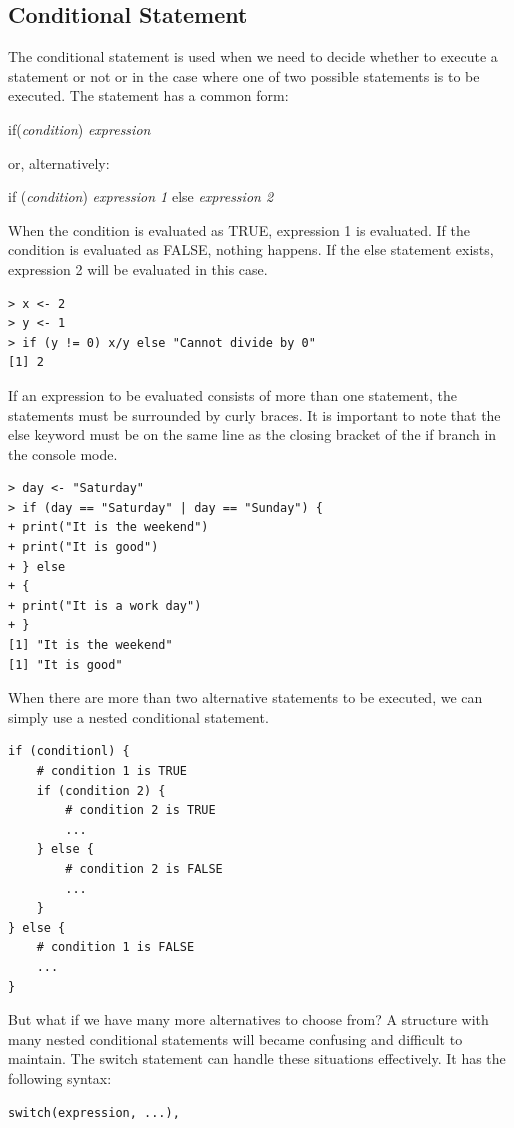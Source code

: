 \documentclass[11pt,openany,executivepaper]{book}
\begin{document}
\subsection{Conditional Statement}
The conditional statement is used when we need to decide whether to execute a statement or not or in the case where one of two possible statements is to be executed. The statement has a common form:

\begin{center}
if(\textit{condition}) \textit{expression}
\end{center}

or, alternatively:
\begin{center}
if (\textit{condition}) \textit{expression 1} else \textit{expression 2}
\end{center}

When the condition is evaluated as TRUE, expression 1 is evaluated. If the condition is evaluated as FALSE, nothing happens. If the else statement exists, expression 2 will be evaluated in this case.

\begin{verbatim}
> x <- 2
> y <- 1
> if (y != 0) x/y else "Cannot divide by 0"
[1] 2
\end{verbatim}

If an expression to be evaluated consists of more than one statement, the statements must be surrounded by curly braces. It is important to note that the else keyword must be on the same line as the closing bracket of the if branch in the console mode.

\begin{verbatim}
> day <- "Saturday"
> if (day == "Saturday" | day == "Sunday") {
+ print("It is the weekend")
+ print("It is good")
+ } else
+ {
+ print("It is a work day")
+ }
[1] "It is the weekend"
[1] "It is good"
\end{verbatim}

When there are more than two alternative statements to be executed, we can simply use a nested conditional statement.

\begin{verbatim}
if (conditionl) {
    # condition 1 is TRUE
    if (condition 2) {
        # condition 2 is TRUE
        ...
    } else {
        # condition 2 is FALSE
        ...
    }
} else {
    # condition 1 is FALSE
    ...
}
\end{verbatim}

But what if we have many more alternatives to choose from? A structure with many nested conditional statements will became confusing and difficult to maintain. The switch statement can handle these situations effectively. It has the following syntax:
\begin{center}
\begin{BVerbatim}
switch(expression, ...),
\end{BVerbatim}
\end{center}
\end{document}
